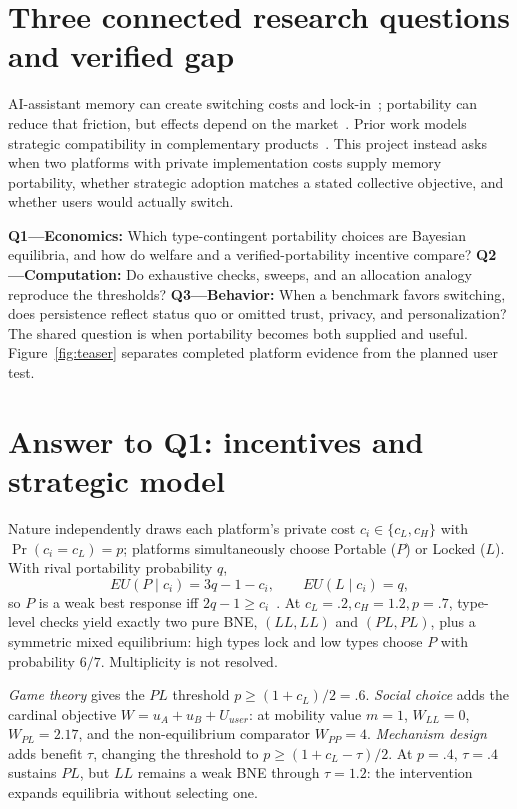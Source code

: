 \section{Three connected research questions and verified gap}
AI-assistant memory can create switching costs and lock-in~\cite{farrell2007coordination}; portability can reduce that friction, but effects depend on the market~\cite{viard2007switching,kim2026portability}. Prior work models strategic compatibility in complementary products~\cite{jeon2023compatibility}. This project instead asks when two platforms with private implementation costs supply memory portability, whether strategic adoption matches a stated collective objective, and whether users would actually switch.

\textbf{Q1---Economics:} Which type-contingent portability choices are Bayesian equilibria, and how do welfare and a verified-portability incentive compare? \textbf{Q2---Computation:} Do exhaustive checks, sweeps, and an allocation analogy reproduce the thresholds? \textbf{Q3---Behavior:} When a benchmark favors switching, does persistence reflect status quo or omitted trust, privacy, and personalization? The shared question is when portability becomes both supplied and useful. Figure~\ref{fig:teaser} separates completed platform evidence from the planned user test.

\section{Answer to Q1: incentives and strategic model}
Nature independently draws each platform's private cost $c_i\in\{c_L,c_H\}$ with $\Pr(c_i=c_L)=p$; platforms simultaneously choose Portable ($P$) or Locked ($L$). With rival portability probability $q$,
\[
EU(P\mid c_i)=3q-1-c_i,\qquad EU(L\mid c_i)=q,
\]
so $P$ is a weak best response iff $2q-1\ge c_i$~\cite{harsanyi1968}. At $c_L=.2,c_H=1.2,p=.7$, type-level checks yield exactly two pure BNE, $(LL,LL)$ and $(PL,PL)$, plus a symmetric mixed equilibrium: high types lock and low types choose $P$ with probability $6/7$. Multiplicity is not resolved.

\emph{Game theory} gives the $PL$ threshold $p\ge(1+c_L)/2=.6$. \emph{Social choice} adds the cardinal objective $W=u_A+u_B+U_{user}$: at mobility value $m=1$, $W_{LL}=0$, $W_{PL}=2.17$, and the non-equilibrium comparator $W_{PP}=4$. \emph{Mechanism design} adds benefit $\tau$, changing the threshold to $p\ge(1+c_L-\tau)/2$. At $p=.4$, $\tau=.4$ sustains $PL$, but $LL$ remains a weak BNE through $\tau=1.2$: the intervention expands equilibria without selecting one.

